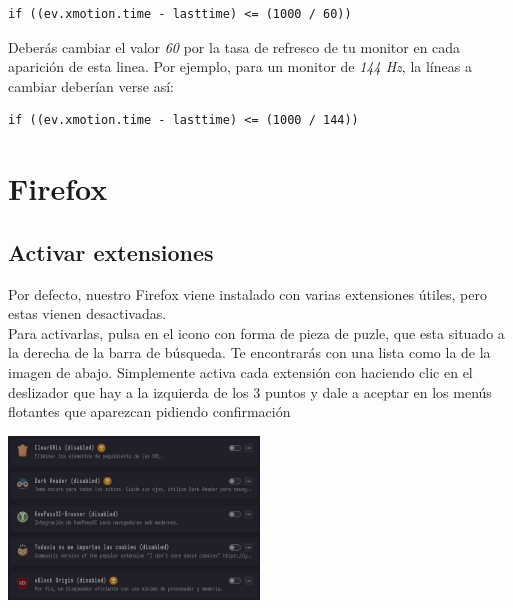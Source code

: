 \documentclass[12pt]{article}
\begin{document}
\begin{verbatim}
if ((ev.xmotion.time - lasttime) <= (1000 / 60))
\end{verbatim}

Deberás cambiar el valor \emph{60} por la tasa de refresco de tu monitor en cada aparición de esta linea. Por ejemplo, para un monitor de \emph{144 Hz}, la líneas a cambiar deberían verse así:

\begin{verbatim}
if ((ev.xmotion.time - lasttime) <= (1000 / 144))
\end{verbatim}

\section{Firefox}

\subsection{Activar extensiones}

\begin{multicols}{2}
\begin{minipage}[t]{0.45\textwidth}
Por defecto, nuestro Firefox viene instalado con varias extensiones útiles, pero estas vienen desactivadas.
\vspace{10pt}\\
Para activarlas, pulsa en el icono con forma de pieza de puzle, que esta situado a la derecha de la barra de búsqueda. Te encontrarás con una lista como la de la imagen de abajo. Simplemente activa cada extensión con haciendo clic en el deslizador que hay a la izquierda de los 3 puntos y dale a aceptar en los menús flotantes que aparezcan pidiendo confirmación
\end{minipage}%
\hfill\includegraphics[width=0.5\textwidth]{images/extensions.jpg}
\end{multicols}

\begin{center}
	
\end{center}
\end{document}
